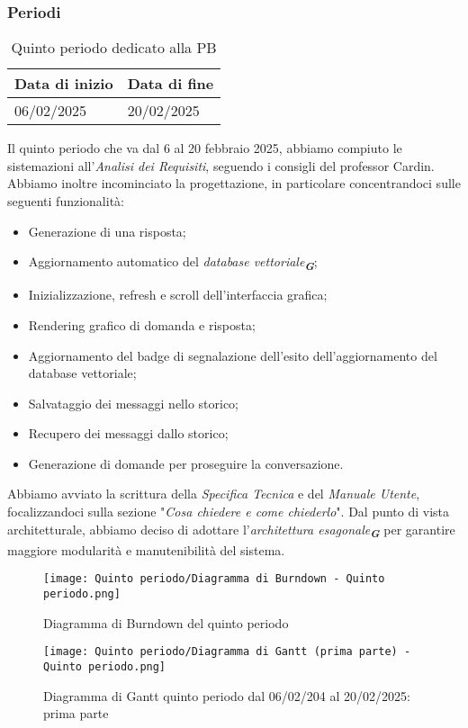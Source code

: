 \subsubsection{Periodi}
\label{sec:periodi}

\label{sec:quinto periodo}
\begin{table}[h!]
    \centering
    \renewcommand{\arraystretch}{1.5} %
    \begin{tabularx}{\textwidth}{|X|X|}\hline
    \rowcolor[HTML]{FFD700} 
    \textbf{Data di inizio} & \textbf{Data di fine} \\ \hline
    06/02/2025 & 20/02/2025 \\ \hline
    \end{tabularx}
    \caption{Quinto periodo dedicato alla PB}
\end{table}
Il quinto periodo che va dal 6 al 20 febbraio 2025, abbiamo compiuto le sistemazioni all'\emph{Analisi dei Requisiti}, seguendo i
consigli del professor Cardin. Abbiamo inoltre incominciato la progettazione, in particolare concentrandoci sulle seguenti funzionalità:
\begin{itemize}
\item Generazione di una risposta;
\item Aggiornamento automatico del {\emph{database vettoriale}}\textsubscript{\textit{\textbf{G}}};
\item Inizializzazione, refresh e scroll dell'interfaccia grafica;
\item Rendering grafico di domanda e risposta;
\item Aggiornamento del badge di segnalazione dell'esito dell'aggiornamento del database vettoriale;
\item Salvataggio dei messaggi nello storico;
\item Recupero dei messaggi dallo storico;
\item Generazione di domande per proseguire la conversazione.
\end{itemize}
Abbiamo avviato la scrittura della \emph{Specifica Tecnica} e del \emph{Manuale Utente}, focalizzandoci sulla sezione
"\emph{Cosa chiedere e come chiederlo}".
Dal punto di vista architetturale, abbiamo deciso di adottare l’{\emph{architettura esagonale}}\textsubscript{\textit{\textbf{G}}}
per garantire maggiore modularità e manutenibilità del sistema.

\newpage
\begin{figure}[h] 
    \centering
    \texttt{[image: Quinto periodo/Diagramma di Burndown - Quinto periodo.png]}
    \caption{Diagramma di Burndown del quinto periodo} 
    \label{fig: Diagramma di Burndown del quinto periodo}
\end{figure}
\newpage
\begin{figure}[h] 
    \centering
    \texttt{[image: Quinto periodo/Diagramma di Gantt (prima parte) - Quinto periodo.png]}
    \caption{Diagramma di Gantt quinto periodo dal 06/02/204 al 20/02/2025: prima parte} 
    \label{fig: Diagramma di Gantt quinto periodo dal 06/02/204 al 20/02/2025: prima parte}
\end{figure}
\newpage


